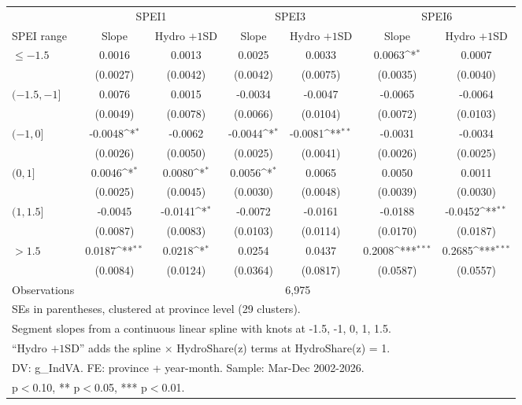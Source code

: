 {
\def\sym#1{\ifmmode^{#1}\else\(^{#1}\)\fi}
\begin{tabular}{l*{6}{c}}
\toprule
 & \multicolumn{2}{c}{SPEI1} & \multicolumn{2}{c}{SPEI3} & \multicolumn{2}{c}{SPEI6} \\
\cmidrule(lr){2-3}\cmidrule(lr){4-5}\cmidrule(lr){6-7}
SPEI range & Slope & Hydro $+1$SD & Slope & Hydro $+1$SD & Slope & Hydro $+1$SD \\
\midrule
$\leq -1.5$ & 0.0016 & 0.0013 & 0.0025 & 0.0033 & 0.0063\sym{*} & 0.0007 \\
 & (0.0027) & (0.0042) & (0.0042) & (0.0075) & (0.0035) & (0.0040) \\
\addlinespace
$(-1.5, -1]$ & 0.0076 & 0.0015 & -0.0034 & -0.0047 & -0.0065 & -0.0064 \\
 & (0.0049) & (0.0078) & (0.0066) & (0.0104) & (0.0072) & (0.0103) \\
\addlinespace
$(-1, 0]$ & -0.0048\sym{*} & -0.0062 & -0.0044\sym{*} & -0.0081\sym{**} & -0.0031 & -0.0034 \\
 & (0.0026) & (0.0050) & (0.0025) & (0.0041) & (0.0026) & (0.0025) \\
\addlinespace
$(0, 1]$ & 0.0046\sym{*} & 0.0080\sym{*} & 0.0056\sym{*} & 0.0065 & 0.0050 & 0.0011 \\
 & (0.0025) & (0.0045) & (0.0030) & (0.0048) & (0.0039) & (0.0030) \\
\addlinespace
$(1, 1.5]$ & -0.0045 & -0.0141\sym{*} & -0.0072 & -0.0161 & -0.0188 & -0.0452\sym{**} \\
 & (0.0087) & (0.0083) & (0.0103) & (0.0114) & (0.0170) & (0.0187) \\
\addlinespace
$> 1.5$ & 0.0187\sym{**} & 0.0218\sym{*} & 0.0254 & 0.0437 & 0.2008\sym{***} & 0.2685\sym{***} \\
 & (0.0084) & (0.0124) & (0.0364) & (0.0817) & (0.0587) & (0.0557) \\
\midrule
Observations & \multicolumn{6}{c}{6,975} \\
\bottomrule
\multicolumn{7}{l}{\footnotesize SEs in parentheses, clustered at province level (29 clusters).} \\
\multicolumn{7}{l}{\footnotesize Segment slopes from a continuous linear spline with knots at -1.5, -1, 0, 1, 1.5.} \\
\multicolumn{7}{l}{\footnotesize ``Hydro $+1$SD'' adds the spline $\times$ HydroShare(z) terms at HydroShare(z) = 1.} \\
\multicolumn{7}{l}{\footnotesize DV: g\_IndVA. FE: province + year-month. Sample: Mar-Dec 2002-2026.} \\
\multicolumn{7}{l}{\footnotesize * p$<$0.10, ** p$<$0.05, *** p$<$0.01.} \\
\end{tabular}
}
